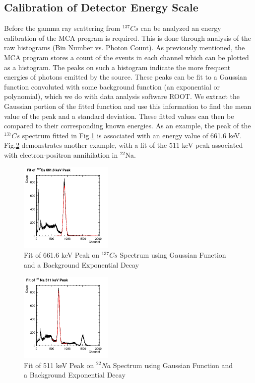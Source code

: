 \documentclass[%
 reprint,
 amsmath,amssymb,
 aps,
 pra,
]{revtex4-1}
\begin{document}
\subsection{Calibration of Detector Energy Scale}
Before the gamma ray scattering from $^{137}Cs$ can be analyzed an energy calibration of the MCA program is required. This is done through analysis of the raw histograms (Bin Number vs. Photon Count). As previously mentioned, the MCA program stores a count of the events in each channel which can be plotted as a histogram. The peaks on such a histogram indicate the more frequent energies of photons emitted by the source. These peaks can be fit to a Gaussian function convoluted with some background function (an exponential or polynomial), which we do with data analysis software ROOT. We extract the Gaussian portion of the fitted function and use this information to find the mean value of the peak and a standard deviation. These fitted values can then be compared to their corresponding known energies\cite{frenchtable}. As an example, the peak of the $^{137}Cs$ spectrum fitted in Fig.\ref{Fig:CsUncalib} is associated with an energy value of 661.6 keV. Fig.\ref{Fig:Na511Fit} demonstrates another example, with a fit of the 511 keV peak associated with electron-positron annihilation in $^{22}$Na.

\begin{figure}[H]
\centering	
	\centering	
	\includegraphics[width=0.4\textwidth]{Cs662keVFit.png}
	\caption{Fit of 661.6 keV Peak on $^{137}Cs$ Spectrum using Gaussian Function and a Background Exponential Decay}
	\label{Fig:CsUncalib}
\end{figure}

\begin{figure}[H]
\centering	
	\centering	
	\includegraphics[width=0.4\textwidth]{Na511keVFit.png}
	\caption{Fit of 511 keV Peak on $^{22}Na$ Spectrum using Gaussian Function and a Background Exponential Decay}
	\label{Fig:Na511Fit}
\end{figure}
\end{document}
